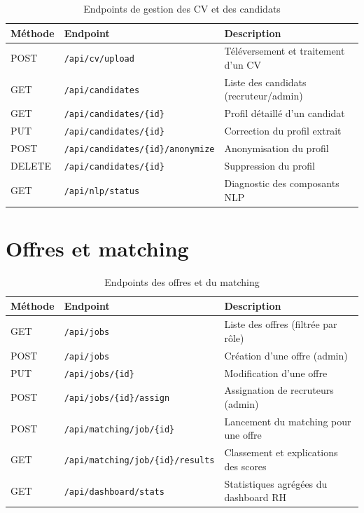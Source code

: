 \documentclass[12pt,a4paper]{report}
\begin{document}
\begin{table}[H]
\centering
\small
\caption{Endpoints de gestion des CV et des candidats}
\begin{tabularx}{\textwidth}{llX}
\toprule
\textbf{Méthode} & \textbf{Endpoint} & \textbf{Description} \\
\midrule
POST & \texttt{/api/cv/upload} & Téléversement et traitement d'un CV \\
GET & \texttt{/api/candidates} & Liste des candidats (recruteur/admin) \\
GET & \texttt{/api/candidates/\{id\}} & Profil détaillé d'un candidat \\
PUT & \texttt{/api/candidates/\{id\}} & Correction du profil extrait \\
POST & \texttt{/api/candidates/\{id\}/anonymize} & Anonymisation du profil \\
DELETE & \texttt{/api/candidates/\{id\}} & Suppression du profil \\
GET & \texttt{/api/nlp/status} & Diagnostic des composants NLP \\
\bottomrule
\end{tabularx}
\end{table}

\section{Offres et matching}

\begin{table}[H]
\centering
\small
\caption{Endpoints des offres et du matching}
\begin{tabularx}{\textwidth}{llX}
\toprule
\textbf{Méthode} & \textbf{Endpoint} & \textbf{Description} \\
\midrule
GET & \texttt{/api/jobs} & Liste des offres (filtrée par rôle) \\
POST & \texttt{/api/jobs} & Création d'une offre (admin) \\
PUT & \texttt{/api/jobs/\{id\}} & Modification d'une offre \\
POST & \texttt{/api/jobs/\{id\}/assign} & Assignation de recruteurs (admin) \\
POST & \texttt{/api/matching/job/\{id\}} & Lancement du matching pour une offre \\
GET & \texttt{/api/matching/job/\{id\}/results} & Classement et explications des scores \\
GET & \texttt{/api/dashboard/stats} & Statistiques agrégées du dashboard RH \\
\bottomrule
\end{tabularx}
\end{table}
\end{document}
